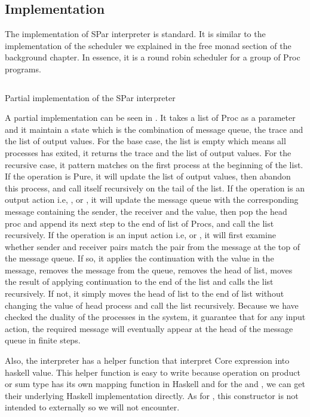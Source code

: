 \subsection{Implementation}
The implementation of SPar interpreter is standard. It is similar to the implementation of the scheduler we explained in the free monad section of the background chapter. In essence, it is a round robin scheduler for a group of Proc programs. 
\begin{listing}[ht]
\inputminted{Haskell}{impl/interp.hs}
\caption{Partial implementation of the SPar interpreter} 
\label{impl:code:interp} %
\end{listing}
A partial implementation can be seen in . It takes a list of Proc as a parameter and it maintain a state which is the combination of message queue, the trace and the list of output values. For the base case, the list is empty which means all processes has exited, it returns the trace and the list of output values. For the recursive case, it pattern matches on the first process at the beginning of the list. If the operation is Pure, it will update the list of output values, then abandon this process, and call itself recursively on the tail of the list. If the operation is an output action i.e, ,  or , it will update the message queue with the corresponding message containing the sender, the receiver and the value, then pop the head proc and append its next step to the end of list of Procs, and call the list recursively. If the operation is an input action i.e,  or , it will first examine whether sender and receiver pairs match the pair from the message at the top of the message queue. If so, it applies the continuation with the value in the message, removes the message from the queue, removes the head of list, moves the result of applying continuation to the end of the list and calls the list recursively. If not, it simply moves the head of list to the end of list without changing the value of head process and call the list recursively. Because we have checked the duality of the processes in the system, it guarantee that for any input action, the required message will eventually appear at the head of the message queue in finite steps.

Also, the interpreter has a helper function that interpret Core expression into haskell value. This helper function is easy to write because operation on product or sum type has its own mapping function in Haskell and for the  and , we can get their underlying Haskell implementation directly. As for , this constructor is not intended to externally so we will not encounter.
